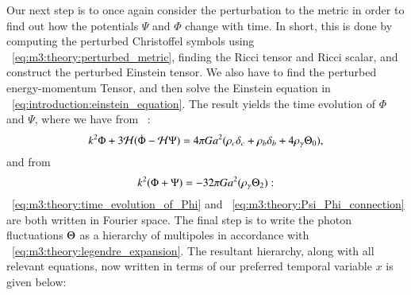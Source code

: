     Our next step is to once again consider the perturbation to the metric in order to find out how the potentials $\Psi$ and $\Phi$ change with time. In short, this is done by computing the perturbed Christoffel symbols using ~\cref{eq:m3:theory:perturbed_metric}, finding the Ricci tensor and Ricci scalar, and construct the perturbed Einstein tensor. We also have to find the perturbed energy-momentum Tensor, and then solve the Einstein equation in ~\cref{eq:introduction:einstein_equation}. The result yields the time evolution of $\Phi$ and $\Psi$, where we have from ~\cite[Eq. 6.41]{dodelson2020modern}:
    \begin{equation}\label{eq:m3:theory:time_evolution_of_Phi}
        k^2\Phi+3\mathcal{H}(\dot{\Phi}-\mathcal{H}\Psi) = 4\pi Ga^2(\rho_c\delta_c+\rho_b\delta_b+4\rho_\gamma\Theta_0),
    \end{equation}
    and from ~\cite[Eq. 6.47]{dodelson2020modern}
    \begin{equation}\label{eq:m3:theory:Psi_Phi_connection}
        k^2(\Phi+\Psi) = -32\pi Ga^2(\rho_\gamma\Theta_2):
    \end{equation}
    ~\cref{eq:m3:theory:time_evolution_of_Phi} and ~\cref{eq:m3:theory:Psi_Phi_connection} are both written in Fourier space. The final step is to write the photon fluctuations $\Theta$ as a hierarchy of multipoles in accordance with ~\cref{eq:m3:theory:legendre_expansion}. The resultant hierarchy, along with all relevant equations, now written in terms of our preferred temporal variable $x$ is given below: 


